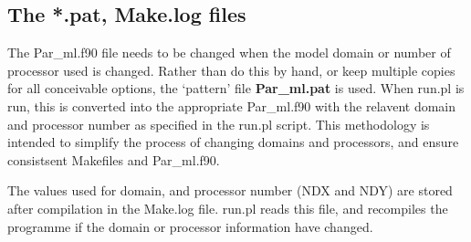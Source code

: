 \subsection{The *.pat, Make.log files}

The Par\_ml.f90 file needs to be changed when the model domain or
number of processor used is changed. Rather than 
do this by hand, or keep multiple copies  for all
conceivable options, 
the `pattern' file {\bf Par\_ml.pat} is 
used. When run.pl is run, this is converted into the
appropriate  Par\_ml.f90 with the relavent domain and
processor number as specified in the run.pl script. This
methodology is intended to simplify the process of changing 
domains and processors, and ensure consistsent Makefiles
and Par\_ml.f90. 

The values used for domain, and processor number (NDX and NDY)
are stored after compilation in the Make.log file. run.pl
reads this file, and recompiles the programme if the
domain or processor information have changed. 


